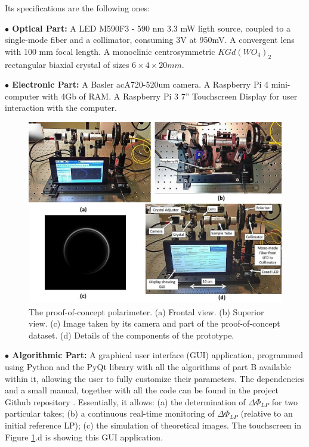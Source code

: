 \documentclass[11pt, a4paper, twoside]{article} %
\begin{document}
Its specifications are the following ones:\vspace{-0.15cm}

{\bf $\bullet$ Optical Part:} A LED M590F3 - 590 nm 3.3 mW ligth source, coupled to a single-mode fiber and a collimator, consuming 3V at 950mV. A convergent lens with 100 mm focal length. A monoclinic centrosymmetric $KGd(WO_4)_2$ rectangular biaxial crystal of sizes $6\times4\times20mm$.\vspace{-0.1cm}


{\bf $\bullet$ Electronic Part:} A Basler acA720-520um camera. A Raspberry Pi 4 mini-computer with 4Gb of RAM. A Raspberry Pi 3 7'' Touchscreen Display for user interaction with the computer.\vspace{0.2cm}

\begin{figure}[h!] 
     \centering 

    \includegraphics[width=0.88\linewidth]{demo.jpg}
\caption{The proof-of-concept polarimeter. (a) Frontal view. (b) Superior view. (c) Image taken by its camera and part of the proof-of-concept dataset. (d) Details of the components of the prototype.}
        \label{fig:proof}
\end{figure}

{\bf $\bullet$ Algorithmic Part:} A graphical user interface (GUI) application, programmed using Python and the PyQt library \cite{pyqt} with all the algorithms of part B available within it, allowing the user to fully customize their parameters. The dependencies and a small manual, together with all the code can be found in the project Github repository \cite{github}. Essentially, it allows: (a) the determination of $\Delta \Phi_{LP}$ for two particular takes; (b) a continuous real-time monitoring of $\Delta\Phi_{LP}$ (relative to an initial reference LP); (c) the simulation of theoretical images. The touchscreen in Figure \ref{fig:proof}.d is showing this GUI application.
\end{document}
